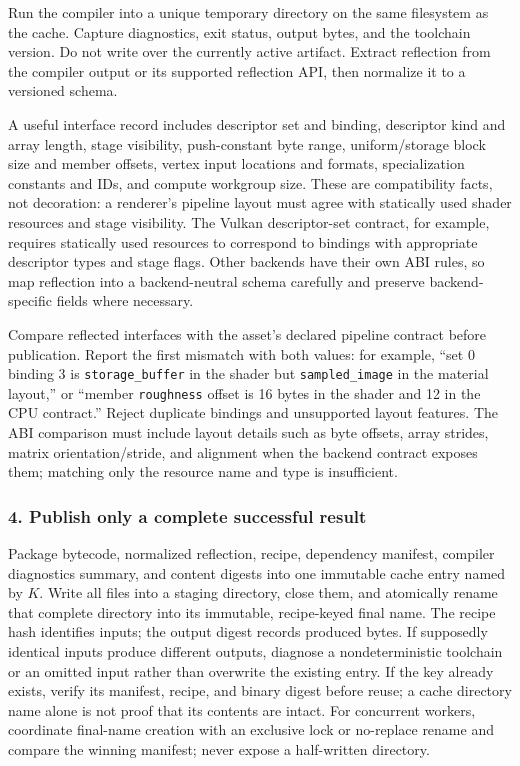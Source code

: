 \hypertarget{05-engine-i-ch010-compile-a-private-candidate-and-collect-reflection}{}

Run the compiler into a unique temporary directory on the same filesystem as the cache. Capture diagnostics, exit status, output bytes, and the toolchain version. Do not write over the currently active artifact. Extract reflection from the compiler output or its supported reflection API, then normalize it to a versioned schema.

A useful interface record includes descriptor set and binding, descriptor kind and array length, stage visibility, push-constant byte range, uniform/storage block size and member offsets, vertex input locations and formats, specialization constants and IDs, and compute workgroup size. These are compatibility facts, not decoration: a renderer's pipeline layout must agree with statically used shader resources and stage visibility. The Vulkan descriptor-set contract, for example, requires statically used resources to correspond to bindings with appropriate descriptor types and stage flags. Other backends have their own ABI rules, so map reflection into a backend-neutral schema carefully and preserve backend-specific fields where necessary.

Compare reflected interfaces with the asset's declared pipeline contract before publication. Report the first mismatch with both values: for example, ``set 0 binding 3 is \texttt{storage\_buffer} in the shader but \texttt{sampled\_image} in the material layout,'' or ``member \texttt{roughness} offset is 16 bytes in the shader and 12 in the CPU contract.'' Reject duplicate bindings and unsupported layout features. The ABI comparison must include layout details such as byte offsets, array strides, matrix orientation/stride, and alignment when the backend contract exposes them; matching only the resource name and type is insufficient.

\subsubsection{4. Publish only a complete successful result}\label{05-engine-i-ch010-publish-only-a-complete-successful-result}

\hypertarget{05-engine-i-ch010-publish-only-a-complete-successful-result}{}

Package bytecode, normalized reflection, recipe, dependency manifest, compiler diagnostics summary, and content digests into one immutable cache entry named by \(K\). Write all files into a staging directory, close them, and atomically rename that complete directory into its immutable, recipe-keyed final name. The recipe hash identifies inputs; the output digest records produced bytes. If supposedly identical inputs produce different outputs, diagnose a nondeterministic toolchain or an omitted input rather than overwrite the existing entry. If the key already exists, verify its manifest, recipe, and binary digest before reuse; a cache directory name alone is not proof that its contents are intact. For concurrent workers, coordinate final-name creation with an exclusive lock or no-replace rename and compare the winning manifest; never expose a half-written directory.

